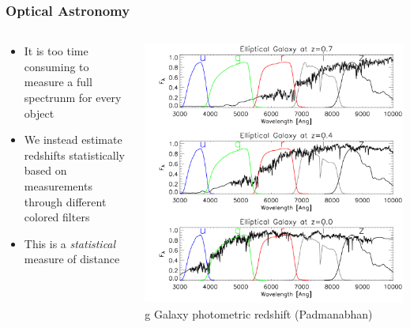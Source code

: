 \documentclass{beamer}
\begin{document}
\frame
{

    \frametitle{Optical Astronomy}


    \begin{columns}
        \begin{column}{0.5\textwidth}
            \begin{itemize}

                \item It is too time consuming to measure a full spectrunm
                    for every object

                \item We instead estimate redshifts statistically based on
                    measurements through different colored filters

                \item This is a {\em statistical} measure of distance

            \end{itemize}
        \end{column}
        \begin{column}{0.5\textwidth}
            \begin{center}
                \includegraphics[width=\textwidth]{lrg_spectrum.png}
g               \newline
                {\tiny Galaxy photometric redshift (Padmanabhan)}
            \end{center}

            
        \end{column}
    \end{columns}


}
\end{document}

